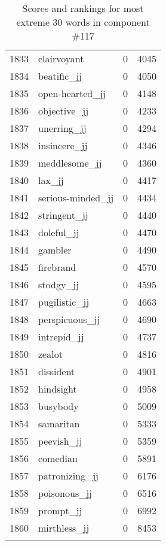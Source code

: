 \begin{longtable}[!htbp]{| rlr@{.}l |}
    1833 & clairvoyant & 0 & 4045 \\
    1834 & beatific\_jj & 0 & 4050 \\
    1835 & open-hearted\_jj & 0 & 4148 \\
    1836 & objective\_jj & 0 & 4233 \\
    1837 & unerring\_jj & 0 & 4294 \\
    1838 & insincere\_jj & 0 & 4346 \\
    1839 & meddlesome\_jj & 0 & 4360 \\
    1840 & lax\_jj & 0 & 4417 \\
    1841 & serious-minded\_jj & 0 & 4434 \\
    1842 & stringent\_jj & 0 & 4440 \\
    1843 & doleful\_jj & 0 & 4470 \\
    1844 & gambler & 0 & 4490 \\
    1845 & firebrand & 0 & 4570 \\
    1846 & stodgy\_jj & 0 & 4595 \\
    1847 & pugilistic\_jj & 0 & 4663 \\
    1848 & perspicuous\_jj & 0 & 4690 \\
    1849 & intrepid\_jj & 0 & 4737 \\
    1850 & zealot & 0 & 4816 \\
    1851 & dissident & 0 & 4901 \\
    1852 & hindsight & 0 & 4958 \\
    1853 & busybody & 0 & 5009 \\
    1854 & samaritan & 0 & 5333 \\
    1855 & peevish\_jj & 0 & 5359 \\
    1856 & comedian & 0 & 5891 \\
    1857 & patronizing\_jj & 0 & 6176 \\
    1858 & poisonous\_jj & 0 & 6516 \\
    1859 & prompt\_jj & 0 & 6992 \\
    1860 & mirthless\_jj & 0 & 8453 \\
    \hline
    \caption{Scores and rankings for most extreme 30 words in component \#117} \\
\end{longtable}
